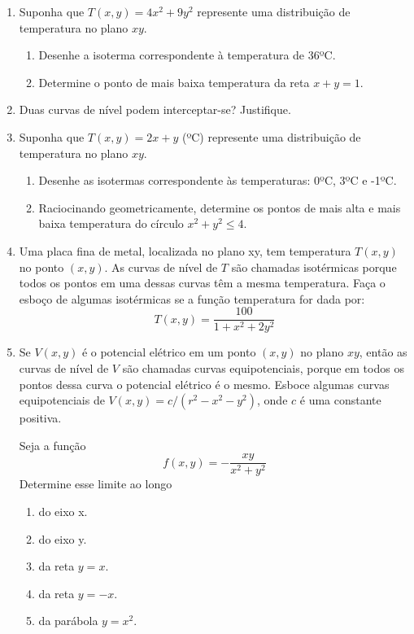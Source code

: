 \documentclass[11pt,a4paper]{article}
\begin{document}
\begin{enumerate}
		\item Suponha que $T(x,y) = 4x^2 + 9y^2$ represente uma distribuição de temperatura no plano $xy$.
			\begin{enumerate}
				\item Desenhe a isoterma correspondente à temperatura de 36ºC.
				\item Determine o ponto de mais baixa temperatura da reta $x + y = 1$.
			\end{enumerate}	
		\item Duas curvas de nível podem interceptar-se? Justifique.
		\item Suponha que $T(x,y) = 2x + y$ (ºC) represente uma distribuição de temperatura no plano $xy$.	
			\begin{enumerate}
				\item Desenhe as isotermas correspondente às temperaturas: 0ºC, 3ºC e -1ºC.
				\item Raciocinando geometricamente, determine os pontos de mais alta e mais baixa temperatura do círculo $x^2 + y^2 \leq 4 $.
			\end{enumerate}	
		\item Uma placa fina de metal, localizada no plano xy, tem temperatura $T(x,y)$ no ponto $(x,y)$. As curvas de nível de $T$ são chamadas isotérmicas porque todos os pontos em uma dessas curvas têm a mesma temperatura. Faça o esboço de algumas isotérmicas se a função temperatura for dada por:
		$$T(x,y) = \displaystyle\frac{100}{1 + x^2 + 2y^2} $$	
		\item Se $V(x,y)$ é o potencial elétrico em um ponto $(x,y)$ no plano $xy$, então as curvas de nível de $V$ são chamadas curvas equipotenciais, porque em todos os pontos dessa curva o potencial elétrico é o mesmo. Esboce algumas curvas equipotenciais de $V(x,y) = c / (r^2 - x^2 - y^2)$, onde $c$ é uma constante positiva.
		
		 Seja a função
		$$f(x,y) = - \displaystyle\frac{xy}{x^2 + y^2} $$
		Determine esse limite ao longo
	\begin{enumerate}
		\item do eixo x.
		\item do eixo y.
		\item da reta $y = x$.
		
		
		
		
		
		
		\item da reta $y = -x$.
		\item da parábola $y = x^2$.
	\end{enumerate}
	

\end{enumerate}
\end{document}
